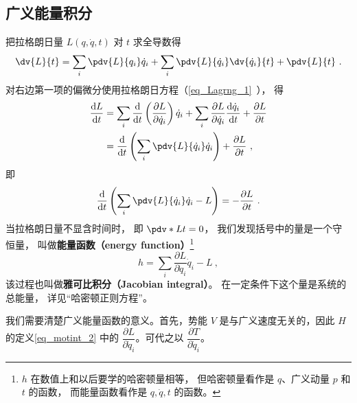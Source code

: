 \subsection{广义能量积分}

把拉格朗日量 $L(q, \dot{q}, t)$ 对 $t$ 求全导数得
\begin{equation}
\dv{L}{t} = \sum_{i} \pdv{L}{q_i} \dot{q}_i + \sum_{i} \pdv{L}{\dot{q}_i} \dv{\dot{q}_i}{t} + \pdv{L}{t}~.
\end{equation}
对右边第一项的偏微分使用拉格朗日方程（\autoref{eq_Lagrng_1}~）， 得
\begin{equation}
\begin{aligned}
\frac{\mathrm{d} L}{\mathrm{d} t} &=\sum_{i} \frac{\mathrm{d}}{\mathrm{d} t}\left(\frac{\partial L}{\partial \dot{q}_{i}}\right) \dot{q}_{i}+\sum_{i} \frac{\partial L}{\partial \dot{q}_{i}} \frac{\mathrm{d} \dot{q}_{i}}{\mathrm{d} t} + \frac{\partial L}{\partial t} \\
&= \frac{\mathrm{d}}{\mathrm{d} t}\left(\sum_{i} \pdv{L}{\dot q_i} \dot{q}_{i}\right) + \frac{\partial L}{\partial t}~,
\end{aligned}
\end{equation}
即
\begin{equation} \label{eq_motint_1}
\frac{\mathrm{d}}{\mathrm{d} t}\left(\sum_{i} \pdv{L}{\dot q_i} \dot{q}_{i}-L\right) = -\frac{\partial L}{\partial t}~.
\end{equation}
当拉格朗日量不显含时间时， 即 $\pdv*{L}{t} = 0$， 我们发现括号中的量是一个守恒量， 叫做\textbf{能量函数（energy function）}\footnote{$h$ 在数值上和以后要学的哈密顿量相等， 但哈密顿量看作是 $q$、广义动量 $p$ 和 $t$ 的函数， 而能量函数看作是 $q, \dot q, t$ 的函数。}
\begin{equation} \label{eq_motint_2}
h = \sum_{i} \frac{\partial L}{\partial \dot{q}_{i}} \dot{q}_{i}-L~,
\end{equation}
该过程也叫做\textbf{雅可比积分（Jacobian integral）}。 在一定条件下这个量是系统的总能量， 详见“哈密顿正则方程”。


我们需要清楚广义能量函数的意义。首先，势能 $V$ 是与广义速度无关的，因此 $H$ 的定义\autoref{eq_motint_2} 中的 $\dfrac{\partial L}{\partial \dot q_i}$。可代之以 $\dfrac{\partial T}{\partial \dot q_i}$。

